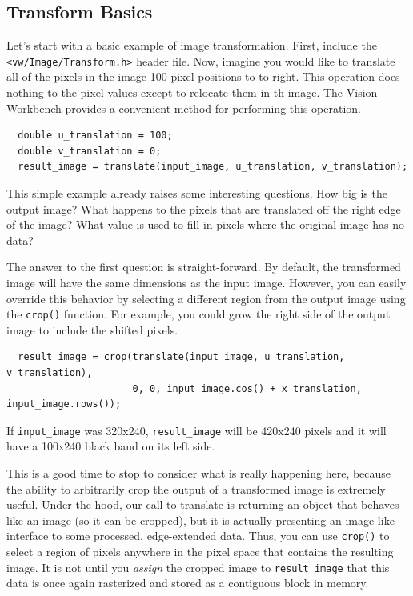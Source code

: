 \subsection{Transform Basics}

Let's start with a basic example of image transformation.  First,
include the \verb#<vw/Image/Transform.h># header file.  Now, imagine
you would like to translate all of the pixels in the image 100 pixel
positions to to right.  This operation does nothing to the pixel
values except to relocate them in th image.  The Vision Workbench
provides a convenient method for performing this operation.

\begin{verbatim}
  double u_translation = 100;
  double v_translation = 0;
  result_image = translate(input_image, u_translation, v_translation);
\end{verbatim}

This simple example already raises some interesting questions.  How
big is the output image?  What happens to the pixels that are
translated off the right edge of the image?  What value is used to
fill in pixels where the original image has no data?

The answer to the first question is straight-forward.  By default, the
transformed image will have the same dimensions as the input image.
However, you can easily override this behavior by selecting a
different region from the output image using the \verb#crop()#
function.  For example, you could grow the right side of the output
image to include the shifted pixels.

\begin{verbatim} 
  result_image = crop(translate(input_image, u_translation, v_translation), 
                      0, 0, input_image.cos() + x_translation, input_image.rows());
\end{verbatim}

If \verb#input_image# was 320x240, \verb#result_image# will be 420x240
pixels and it will have a 100x240 black band on its left side.

This is a good time to stop to consider what is really happening here,
because the ability to arbitrarily crop the output of a transformed
image is extremely useful.  Under the hood, our call to translate is
returning an object that behaves like an image (so it can be cropped),
but it is actually presenting an image-like interface to some
processed, edge-extended data.  Thus, you can use \verb#crop()# to
select a region of pixels anywhere in the pixel space that contains
the resulting image.  It is not until you {\em assign} the cropped
image to \verb#result_image# that this data is once again rasterized
and stored as a contiguous block in memory.

